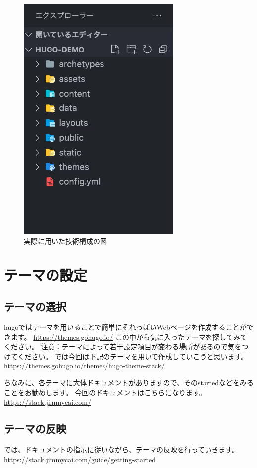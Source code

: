   \begin{figure}[H]
    \centering
    \includegraphics[width=8cm]{./image/02-chap5/filetree.png}
    \caption{実際に用いた技術構成の図}
    \label{chap5-firetree-image}
  \end{figure}

\section{テーマの設定}
  \subsection{テーマの選択}
    hugoではテーマを用いることで簡単にそれっぽいWebページを作成することができます。
    \url{https://themes.gohugo.io/}
    この中から気に入ったテーマを探してみてください。
    注意：テーマによって若干設定項目が変わる場所があるので気をつけてください。
    では今回は下記のテーマを用いて作成していこうと思います。
    \url{https://themes.gohugo.io/themes/hugo-theme-stack/}

    ちなみに、各テーマに大体ドキュメントがありますので、そのstartedなどをみることをお勧めします。
    今回のドキュメントはこちらになります。
    \url{https://stack.jimmycai.com/}

  \subsection{テーマの反映}
    では、ドキュメントの指示に従いながら、テーマの反映を行っていきます。
    \url{https://stack.jimmycai.com/guide/getting-started}


